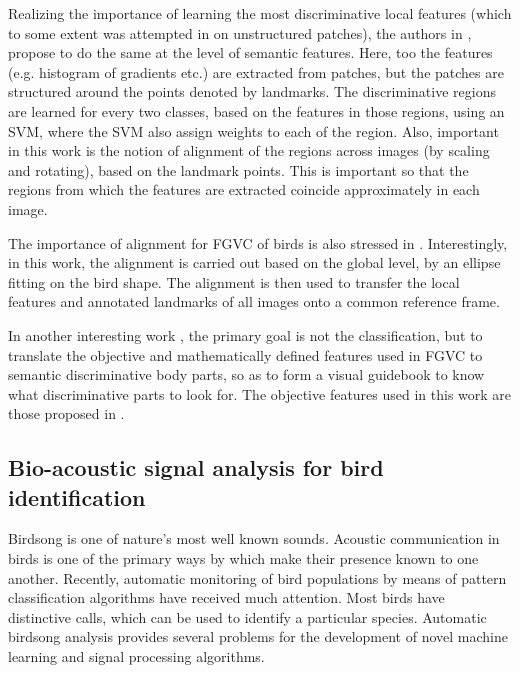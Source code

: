 \documentclass{article}
\begin{document}
Realizing the importance of learning the most discriminative local features (which to some extent was attempted in \cite{hierarchy} on unstructured patches), the authors in \cite{poof}, propose to do the same at the level of semantic features. Here, too the features (e.g. histogram of gradients etc.) are extracted from patches, but the patches are structured around the points denoted by landmarks. The discriminative regions are learned for every two classes, based on the features in those regions, using an SVM, where the SVM also assign weights to each of the region. Also, important in this work is the notion of alignment of the regions across images (by scaling and rotating), based on the landmark points. This is important so that the regions from which the features are extracted coincide approximately in each image. 

The importance of alignment for FGVC of birds is also stressed in \cite{align}. Interestingly, in this work, the alignment is carried out based on the global level, by an ellipse fitting on the bird shape. The alignment is then used to transfer the local features and annotated landmarks of all images onto a common reference frame.  

In another interesting work \cite{crow}, the primary goal is not the classification, but to translate the objective and mathematically defined features used in FGVC to semantic discriminative body parts, so as to form a visual guidebook to know what discriminative parts to look for. The objective features used in this work are those proposed in \cite{poof}.
 
\subsection{Bio-acoustic signal analysis for bird identification}


Birdsong is one of nature's most well known sounds. Acoustic communication in
birds is one of the primary ways by which make their presence known to one
another. 
Recently, automatic monitoring of bird populations by means of pattern
classification algorithms have received much attention. Most birds have
distinctive calls, which can be used to identify a particular species. Automatic
birdsong analysis provides several problems for the development of novel machine learning
and signal processing algorithms.
\end{document}

